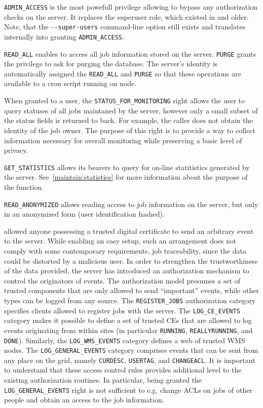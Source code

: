 \verb'ADMIN_ACCESS' is the most powefull privilege allowing to bypass any
authorization checks on the server. It replaces the superuser role, which
existed in  and older. Note, that the \verb'--super-users'
command-line option still exists and translates internally into granting
\verb'ADMIN_ACCESS'.

\verb'READ_ALL' enables to access all job information stored on the server.
\verb'PURGE' grants the privilege to ask for purging the \LB database.  The \LB
server's identity is automatically assigned the \verb'READ_ALL' and
\verb'PURGE' so that these operations are available \eg to a cron script
running on \LB node.

When granted to a user, the \verb'STATUS_FOR_MONITORING' right allows the user to
query statuses of all jobs maintaned by the server, however only a small
subset of the status fields is returned to back. For example, the caller
does not obtain the identity of the job owner. The purpose of this right is
to provide a way to collect information necessary for overall monitoring
while preserving a basic level of privacy.

\verb'GET_STATISTICS' allows its bearers to query for on-line statitistics
generated by the \LB server. See~\ref{maintain:statistics} for more
information about the purpose of the function.

\verb'READ_ANONYMIZED' allows reading access to job information on the server,
but only in an anonymized form (user identification hashed).

 allowed anyone possessing a trusted digital certificate to send an
arbitrary event to the \LB server. While enabling an easy setup, such an
arrangement does not comply with some contemporary requirements, \eg job
traceability, since the data could be distorted by a malicious user.  In order
to strengthen the trustworthiness of the data provided, the 
server has introduced an authorization mechanism to control the originators
of events.  The authorization model presumes a set of trusted components
that are only allowed to send ``important'' events, while other types can be
logged from any source. The \verb'REGISTER_JOBS' authorization category
specifies clients allowed to register jobs with the \LB server. The
\verb'LOG_CE_EVENTS' category makes it possible to define a set of trusted
CEs that are allowed to log events originating from within sites (in
particular \verb'RUNNING', \verb'REALLYRUNNING', and \verb'DONE').
Similarly, the \verb'LOG_WMS_EVENTS' category defines a web of trusted WMS
nodes. The \verb'LOG_GENERAL_EVENTS' category comprises events that can be
sent from any place on the grid, namely \verb'CURDESC', \verb'USERTAG', and
\verb'CHANGEACL'. It is important to understand that these access control
rules provides additional level to the existing authorization routines.
In particular, being granted the \verb'LOG_GENERAL_EVENTS' right is not sufficient to
e.g. change ACLs on jobs of other people and obtain an access to the job information.


